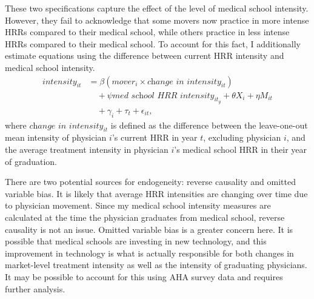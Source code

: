 These two specifications capture the effect of the level of medical school intensity. However, they fail to acknowledge that some movers now practice in more intense HRRs compared to their medical school, while others practice in less intense HRRs compared to their medical school. To account for this fact, I additionally estimate equations using the difference between current HRR intensity and medical school intensity. 
    \begin{align} \label{eq:delta}
        intensity_{it} 
        &= \beta (mover_i \times \textit{change in intensity}_{it}) \nonumber\\
        &\quad + \psi \textit{med school HRR intensity}_{it_g} + \theta X_{i} + \eta M_{it} \nonumber\\
        &\quad + \gamma_i + \tau_t + \epsilon_{it},
    \end{align}
where $\textit{change in intensity}_{it}$ is defined as the difference between the leave-one-out mean intensity of physician $i$'s current HRR in year $t$, excluding physician $i$, and the average treatment intensity in physician $i$'s medical school HRR in their year of graduation. 

There are two potential sources for endogeneity: reverse causality and omitted variable bias. It is likely that average HRR intensities are changing over time due to physician movement. Since my medical school intensity measures are calculated at the time the physician graduates from medical school, reverse causality is not an issue. Omitted variable bias is a greater concern here. It is possible that medical schools are investing in new technology, and this improvement in technology is what is actually responsible for both changes in market-level treatment intensity as well as the intensity of graduating physicians. It may be possible to account for this using AHA survey data and requires further analysis. 
